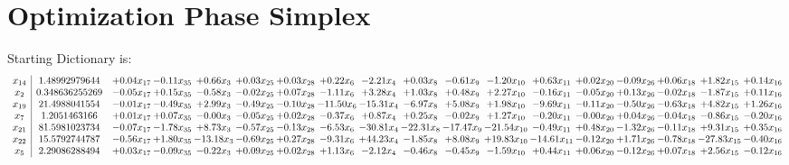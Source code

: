 \documentclass[9pt]{article}
\begin{document}
\section{Optimization Phase Simplex}
Starting Dictionary is:
\[\begin{array}{c| c c@{\hskip 2pt} c@{\hskip 2pt} c@{\hskip 2pt} c@{\hskip 2pt} c@{\hskip 2pt} c@{\hskip 2pt} c@{\hskip 2pt} c@{\hskip 2pt} c@{\hskip 2pt} c@{\hskip 2pt} c@{\hskip 2pt} c@{\hskip 2pt} c@{\hskip 2pt} c@{\hskip 2pt} c@{\hskip 2pt} c@{\hskip 2pt} }
 x_{14}   &  1.48992979644 & +  0.04 x_{17} & -0.11 x_{35} & +  0.66 x_{3} & +  0.03 x_{25} & +  0.03 x_{28} & +  0.22 x_{6} & -2.21 x_{4} & +  0.03 x_{8} & -0.61 x_{9} & -1.20 x_{10} & +  0.63 x_{11} & +  0.02 x_{20} & -0.09 x_{26} & +  0.06 x_{18} & +  1.82 x_{15} & +  0.14 x_{16}\\
 x_{2}   &  0.348636255269 & -0.05 x_{17} & +  0.15 x_{35} & -0.58 x_{3} & -0.02 x_{25} & +  0.07 x_{28} & -1.11 x_{6} & +  3.28 x_{4} & +  1.03 x_{8} & +  0.48 x_{9} & +  2.27 x_{10} & -0.16 x_{11} & -0.05 x_{20} & +  0.13 x_{26} & -0.02 x_{18} & -1.87 x_{15} & +  0.11 x_{16}\\
 x_{19}   &  21.4988041554 & -0.01 x_{17} & -0.49 x_{35} & +  2.99 x_{3} & -0.49 x_{25} & -0.10 x_{28} & -11.50 x_{6} & -15.31 x_{4} & -6.97 x_{8} & +  5.08 x_{9} & +  1.98 x_{10} & -9.69 x_{11} & -0.11 x_{20} & -0.50 x_{26} & -0.63 x_{18} & +  4.82 x_{15} & +  1.26 x_{16}\\
 x_{7}   &  1.2051463166 & +  0.01 x_{17} & +  0.07 x_{35} & -0.00 x_{3} & -0.05 x_{25} & +  0.02 x_{28} & -0.37 x_{6} & +  0.87 x_{4} & +  0.25 x_{8} & -0.02 x_{9} & +  1.27 x_{10} & -0.20 x_{11} & -0.00 x_{20} & +  0.04 x_{26} & -0.04 x_{18} & -0.86 x_{15} & -0.20 x_{16}\\
 x_{21}   &  81.5981023734 & -0.07 x_{17} & -1.78 x_{35} & +  8.73 x_{3} & -0.57 x_{25} & -0.13 x_{28} & -6.53 x_{6} & -30.81 x_{4} & -22.31 x_{8} & -17.47 x_{9} & -21.54 x_{10} & -0.49 x_{11} & +  0.48 x_{20} & -1.32 x_{26} & -0.11 x_{18} & +  9.31 x_{15} & +  0.35 x_{16}\\
 x_{22}   &  15.5792744787 & -0.56 x_{17} & +  1.80 x_{35} & -13.18 x_{3} & -0.69 x_{25} & +  0.27 x_{28} & -9.31 x_{6} & + 44.23 x_{4} & -1.85 x_{8} & +  8.08 x_{9} & + 19.83 x_{10} & -14.61 x_{11} & -0.12 x_{20} & +  1.71 x_{26} & -0.78 x_{18} & -27.83 x_{15} & -0.40 x_{16}\\
 x_{5}   &  2.29086288494 & +  0.03 x_{17} & -0.09 x_{35} & -0.22 x_{3} & +  0.09 x_{25} & +  0.02 x_{28} & +  1.13 x_{6} & -2.12 x_{4} & -0.46 x_{8} & -0.45 x_{9} & -1.59 x_{10} & +  0.44 x_{11} & +  0.06 x_{20} & -0.12 x_{26} & +  0.07 x_{18} & +  2.56 x_{15} & -0.12 x_{16}\\

\end{array}\]
\end{document}
